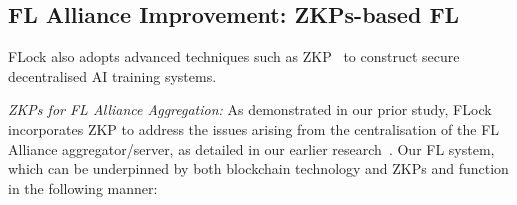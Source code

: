 \documentclass[conference]{IEEEtran}
\newcommand{\ZKP}{\ac{ZKP}\xspace}
\newcommand{\FL}{\ac{FL} Alliance\xspace}
\begin{document}
\subsection{\FL Improvement: ZKPs-based FL} 

FLock also adopts advanced techniques such as \ZKP~\cite{sasson2014zerocash, groth2016size} to construct secure decentralised AI training systems.


\textit{ZKPs for \FL Aggregation:} As demonstrated in our prior study, FLock incorporates \ZKP to address the issues arising from the centralisation of the \FL aggregator/server, as detailed in our earlier research~\cite{wang2023zkfl}.  Our FL system, which can be underpinned by both blockchain technology and ZKPs and function in the following manner:
\end{document}
